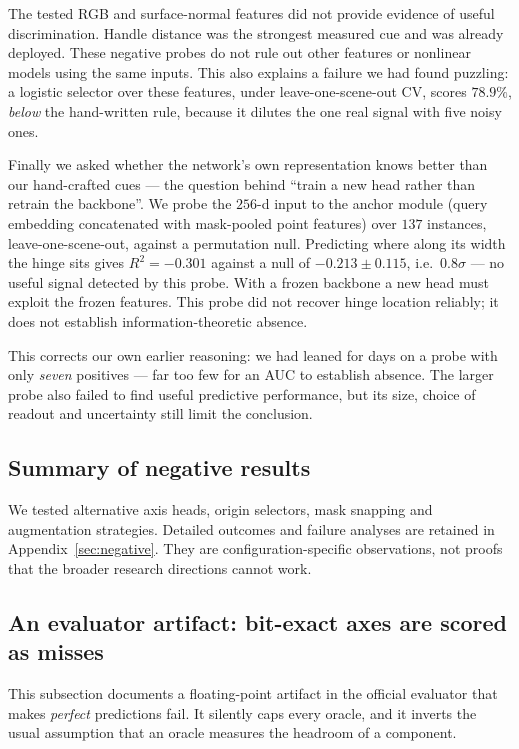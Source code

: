 \documentclass[11pt]{article}
\begin{document}
The tested RGB and surface-normal features did not provide evidence of
useful discrimination. Handle distance was the strongest measured cue and
was already deployed. These negative probes do not rule out other features
or nonlinear models using the same inputs. This also explains a failure we had found puzzling: a logistic
selector over these features, under leave-one-scene-out CV, scores $78.9\%$,
\emph{below} the hand-written rule, because it dilutes the one real signal
with five noisy ones.

Finally we asked whether the network's own representation knows better than
our hand-crafted cues --- the question behind ``train a new head rather than
retrain the backbone''. We probe the $256$-d input to the anchor module
(query embedding concatenated with mask-pooled point features) over $137$
instances, leave-one-scene-out, against a permutation null. Predicting where
along its width the hinge sits gives $R^2 = -0.301$ against a null of
$-0.213 \pm 0.115$, i.e.\ $0.8\sigma$ --- no useful signal detected by this probe. With a frozen backbone a
new head must exploit the frozen features. This probe did not recover hinge
location reliably; it does not establish information-theoretic absence.

This corrects our own earlier reasoning: we had leaned for days on a probe
with only \emph{seven} positives --- far too few for an AUC to establish
absence. The larger probe also failed to find useful predictive performance, but
its size, choice of readout and uncertainty still limit the conclusion.

\subsection{Summary of negative results}
We tested alternative axis heads, origin selectors, mask snapping and
augmentation strategies. Detailed outcomes and failure analyses are retained
in Appendix~\ref{sec:negative}. They are configuration-specific observations,
not proofs that the broader research directions cannot work.

\subsection{An evaluator artifact: bit-exact axes are scored as misses}
\label{sec:oracle-artifact}

This subsection documents a floating-point artifact in the official
evaluator that makes \emph{perfect} predictions fail. It silently caps every
oracle, and it inverts the usual assumption that an oracle measures the
headroom of a component.
\end{document}
